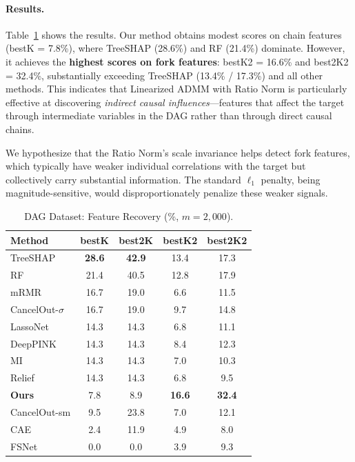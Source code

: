 \documentclass{uai2026} %
\theoremstyle{definition}
\theoremstyle{remark}
\begin{document}
\paragraph{Results.}
Table~\ref{tab:dag} shows the results.
Our method obtains modest scores on chain features (bestK = 7.8\%), where TreeSHAP (28.6\%) and RF (21.4\%) dominate.
However, it achieves the \textbf{highest scores on fork features}: bestK2 = 16.6\% and best2K2 = 32.4\%, substantially exceeding TreeSHAP (13.4\% / 17.3\%) and all other methods.
This indicates that Linearized ADMM with Ratio Norm is particularly effective at discovering \emph{indirect causal influences}---features that affect the target through intermediate variables in the DAG rather than through direct causal chains.

We hypothesize that the Ratio Norm's scale invariance helps detect fork features, which typically have weaker individual correlations with the target but collectively carry substantial information.
The standard $\ell_1$ penalty, being magnitude-sensitive, would disproportionately penalize these weaker signals.

\begin{table}[t]
    \centering
    \caption{DAG Dataset: Feature Recovery (\%, $m{=}2{,}000$).}\label{tab:dag}
    \begin{tabular}{lcccc}
        \toprule
        \textbf{Method} & \textbf{bestK} & \textbf{best2K} & \textbf{bestK2} & \textbf{best2K2} \\
        \midrule
        TreeSHAP & \textbf{28.6} & \textbf{42.9} & 13.4 & 17.3 \\
        RF       & 21.4 & 40.5 & 12.8 & 17.9 \\
        mRMR     & 16.7 & 19.0 & 6.6  & 11.5 \\
        CancelOut-$\sigma$ & 16.7 & 19.0 & 9.7 & 14.8 \\
        LassoNet & 14.3 & 14.3 & 6.8  & 11.1 \\
        DeepPINK & 14.3 & 14.3 & 8.4  & 12.3 \\
        MI       & 14.3 & 14.3 & 7.0  & 10.3 \\
        Relief   & 14.3 & 14.3 & 6.8  & 9.5 \\
        \textbf{Ours} & 7.8 & 8.9 & \textbf{16.6} & \textbf{32.4} \\
        CancelOut-sm & 9.5 & 23.8 & 7.0 & 12.1 \\
        CAE      & 2.4  & 11.9 & 4.9  & 8.0 \\
        FSNet    & 0.0  & 0.0  & 3.9  & 9.3 \\
        \bottomrule
    \end{tabular}
\end{table}
\end{document}
